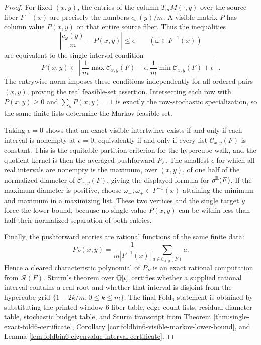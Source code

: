 \begin{proof}
For fixed \((x,y)\), the entries of the column \(T_mM(\cdot,y)\) over the source fiber \(F^{-1}(x)\) are precisely the numbers \(c_\omega(y)/m\).  A visible matrix \(P\) has column value \(P(x,y)\) on that entire source fiber.  Thus the inequalities
\[
\left|\frac{c_\omega(y)}{m}-P(x,y)\right|\le \epsilon
\qquad(\omega\in F^{-1}(x))
\]
are equivalent to the single interval condition
\[
P(x,y)\in
\left[
\frac{1}{m}\max\mathcal C_{x,y}(F)-\epsilon,
\frac{1}{m}\min\mathcal C_{x,y}(F)+\epsilon
\right].
\]
The entrywise norm imposes these conditions independently for all ordered pairs \((x,y)\), proving the real feasible-set assertion.  Intersecting each row with \(P(x,y)\ge0\) and \(\sum_yP(x,y)=1\) is exactly the row-stochastic specialization, so the same finite lists determine the Markov feasible set.

Taking \(\epsilon=0\) shows that an exact visible intertwiner exists if and only if each interval is nonempty at \(
\epsilon=0
\), equivalently if and only if every list \(\mathcal C_{x,y}(F)\) is constant.  This is the equitable-partition criterion for the hypercube walk, and the quotient kernel is then the averaged pushforward \(P_F\).  The smallest \(\epsilon\) for which all real intervals are nonempty is the maximum, over \((x,y)\), of one half of the normalized diameter of \(\mathcal C_{x,y}(F)\), giving the displayed formula for \(\rho^{\mathbb{R}}(F)\).  If the maximum diameter is positive, choose \(\omega_-,\omega_+\in F^{-1}(x)\) attaining the minimum and maximum in a maximizing list.  These two vertices and the single target \(y\) force the lower bound, because no single value \(P(x,y)\) can be within less than half their normalized separation of both entries.

Finally, the pushforward entries are rational functions of the same finite data:
\[
P_F(x,y)=\frac{1}{m|F^{-1}(x)|}\sum_{a\in\mathcal C_{x,y}(F)}a.
\]
Hence a cleared characteristic polynomial of \(P_F\) is an exact rational computation from \(\mathcal R(F)\).  Sturm's theorem over \(\mathbb{Q}[t]\) certifies whether a supplied rational interval contains a real root and whether that interval is disjoint from the hypercube grid \(\{1-2k/m:0\le k\le m\}\).  The final Fold\(_6\) statement is obtained by substituting the printed window-\(6\) fiber table, edge-count lists, residual-diameter table, stochastic budget table, and Sturm transcript from Theorem \ref{thm:single-exact-fold6-certificate}, Corollary \ref{cor:foldbin6-visible-markov-lower-bound}, and Lemma \ref{lem:foldbin6-eigenvalue-interval-certificate}. \qedhere
\end{proof}


